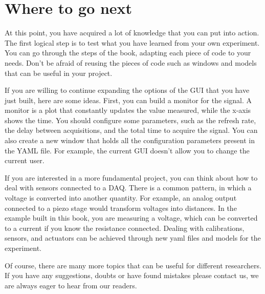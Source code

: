 \section{Where to go next}\label{where-to-gonext}
At this point, you have acquired a lot of knowledge that you can put
into action. The first logical step is to test what you have learned
from your own experiment. You can go through the steps of the book,
adapting each piece of code to your needs. Don't be afraid of reusing
the pieces of code such as windows and models that can be useful in
your project.

If you are willing to continue expanding the options of the {GUI} that
you have just built, here are some ideas. First, you can build a monitor
for the signal. A monitor is a plot that constantly updates the value
measured, while the x-axis shows the time. You should configure some
parameters, such as the refresh rate, the delay between acquisitions,
and the total time to acquire the signal. You can also create a new
window that holds all the configuration parameters present in the {YAML}
file. For example, the current {GUI} doesn't allow you to change the
current user.

If you are interested in a more fundamental project, you can think about
how to deal with sensors connected to a {DAQ}. There is a common
pattern, in which a voltage is converted into another quantity. For
example, an analog output connected to a piezo stage would transform
voltages into distances. In the example built in this book, you are
measuring a voltage, which can be converted to a current if you know the
resistance connected. Dealing with calibrations, sensors, and actuators
can be achieved through new yaml files and models for the experiment.

Of course, there are many more topics that can be useful for different
researchers. If you have any suggestions, doubts or have found mistakes
please contact us, we are always eager to hear from our readers.
